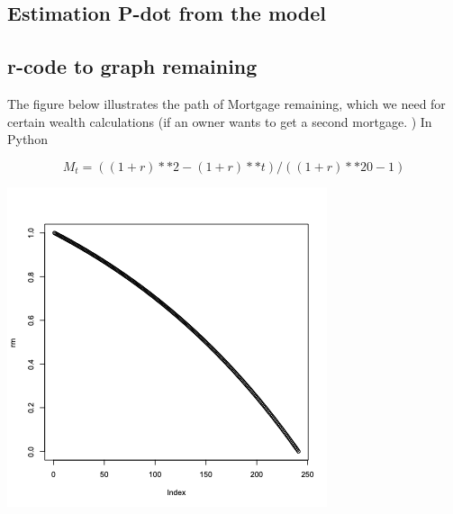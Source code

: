 

\subsection{Estimation P-dot from the model }








\subsection{r-code to graph remaining}
The figure below illustrates the path of Mortgage remaining, which we need for certain wealth calculations (if an owner wants to get a second mortgage.
)
In Python 

\[M_t=((1+r)**2-(1+r)**t) / ((1+r)**20-1)\]

\includegraphics[scale=.25]{fig/declining-balance.png}
  
